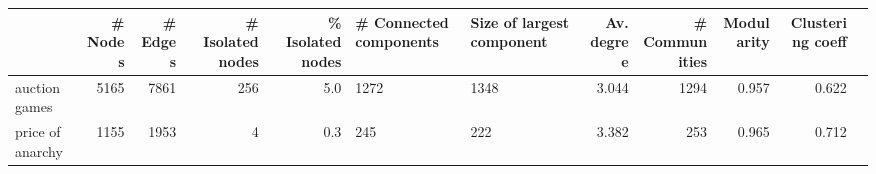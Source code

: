 \begin{tabular}{lrrrrP{0.2\textwidth}P{0.2\textwidth}rrrrr}
\toprule
{} &  \# Nodes &  \# Edges &  \# Isolated nodes &  \% Isolated nodes &  \# Connected components &  Size of largest component &  Av. degree &  \# Communities &  Modularity &  Clustering coeff \\
\midrule
auction games    &     5165 &     7861 &               256 &               5.0 &                    1272 &                       1348 &       3.044 &           1294 &       0.957 &             0.622 \\
price of anarchy &     1155 &     1953 &                 4 &               0.3 &                     245 &                        222 &       3.382 &            253 &       0.965 &             0.712 \\
\bottomrule
\end{tabular}
